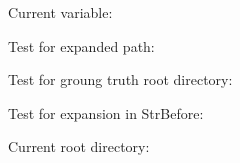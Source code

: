 \documentclass[10pt,a4paper]{article}
\edef\expandedcurrfileabspath{\currfileabspath}
\begin{document}
Current variable: \meaning\currfileabspath %

Test for expanded path: \expandedcurrfileabspath %

Test for groung truth root directory: \rootpathbis %

Test for expansion in StrBefore: \rootpathter %

Current root directory: \rootpath %
\end{document}
